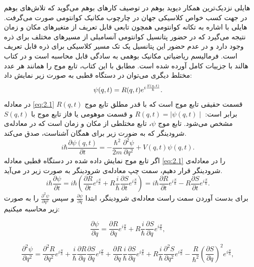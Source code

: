 \documentclass[a4paper,titlepage,12pt,fleqn,oneside]{report}
\begin{document}
	هایلی 
	نزدیک‌ترین همکار دیوید بوهم در توصیف کارهای بوهم می‌گوید که تلاش‌های بوهم در جهت کسب خواص کلاسیکی جهان در چارچوب مکانیک کوانتومی صورت می‌گرفت. هایلی با اشاره به تکانه کوانتومی همچون تابعی قابل تعریف از متغیرهای مکان و زمان نتیجه می‌گیرد که در حضور پتانسیل کوانتومی آنسامبلی از مسیرهای مختلف برای ذره وجود دارد و در عدم حضور این پتانسیل یک تک مسیر کلاسیکی برای ذره قابل تعریف است.  فرمالیسم ریاضیاتی مکانیک بوهمی به سادگی قابل محاسبه است و در کتاب هالند با جزییات کامل آورده شده است. مطابق با این کتاب، تابع موج را همانند هر عدد مختلط دیگری می‌توان در دستگاه قطبی به صورت زیر نمایش داد:
	\begin{equation}
		\centering
		\psi (q,t)=R(q,t)e^{i\frac{S(q,t)}{\hbar}}.
		\label{eq:2.1}
	\end{equation}
	در معادله
	\ref{eq:2.1} 
	$R(q,t)$
	قسمت حقیقی تابع موج است که با قدر مطلق تابع موج برابر است: 
	$R(q,t)=\mid\psi(q,t)\mid$
	و قسمت موهومی یا فاز تابع موج با 
	$S(q,t)$
	مشخص می‌شود.
	تابع موج $\psi$، تابع مختلطی از مکان و زمان است که در معادله‌ی شرودینگر که به ضورت زیر برای همگان آشناست، صدق می‌کند. 
	\begin{equation}
		i \hbar \frac{\partial\psi(q,t)}{\partial t} =-\frac{\hbar^2}{2m}\frac{\partial^2\psi}{\partial q^2}+V(q,t)\psi(q,t) .
		\label{eq:2.2}
	\end{equation}
	اگر تابع موج نمایش داده شده در دستگاه قطبی معادله
	‌\ref{eq:2.1}
	را در معادله‌ی شرودینگر قرار ‌دهیم، سمت چپ معادله‌ی شرودینگر به صورت زیر در می‌آيد. 
	\begin{equation}
		i\hbar \frac{\partial \psi}{\partial t}=i\hbar\left(\frac{\partial R}{\partial t} e^{i\frac{S}{h}} +R\frac{i}{\hbar}\frac{\partial S}{\partial t} e^{i\frac{S}{h}} \right)
		=i\hbar\frac{\partial R}{\partial t}e^{i \frac{S}{\hbar}}-R\frac{\partial S}{\partial t}e^{i \frac{S}{\hbar}}.
	\end{equation}
	برای بدست آوردن سمت راست معادله‌ی شرودینگر، ابتدا $\frac{\partial\psi}{\partial q}$ و سپس  $\frac{\partial^2\psi}{\partial q^2}$ را به صورت  زیر محاسبه میکنیم:
	
	\begin{equation}
		\frac{\partial \psi}{\partial q}=\frac{\partial R}{\partial q} e^{i\frac{S}{h}} +R\frac{i}{\hbar}\frac{\partial S}{\partial q} e^{i\frac{S}{h}} ,
	\end{equation}
	
	\begin{equation}
		\frac{\partial^2 \psi}{\partial q^2}=\frac{\partial^2 R}{\partial q^2} e^{i\frac{S}{h}}+
		\frac{i}{\hbar}\frac{\partial R}{\partial q}\frac{\partial S}{\partial q} e^{i\frac{S}{h}}+
		\frac{\partial R}{\partial q}\frac{i}{\hbar}\frac{\partial S}{\partial q} e^{i\frac{S}{h}}+
		R\frac{i}{\hbar}\frac{\partial^2 S}{\partial q^2} e^{i\frac{S}{h}}-\frac{R}{\hbar^2}\left(\frac{\partial S}{\partial q}\right)^2 e^{i\frac{S}{h}},
	\end{equation}
	
\end{document}
